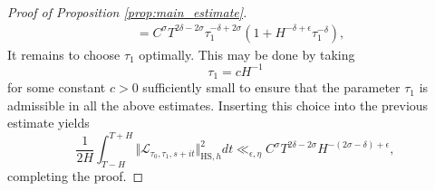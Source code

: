 \documentclass[12pt,letterpaper]{amsart}
\theoremstyle{plain}
\theoremstyle{definition}
\theoremstyle{remark}
\begin{document}
\begin{proof}[Proof of Proposition \ref{prop:main_estimate}]
\begin{align*}
&= C^\sigma T^{2\delta-2 \sigma} \tau_1^{-\delta + 2\sigma} \left( 1 + H^{-\delta+\epsilon}  \tau_1^{-\delta} \right),
\end{align*}
It remains to choose $\tau_1$ optimally. This may be done by taking 
$$
\tau_1 = c H^{-1}
$$
for some constant $c>0$ sufficiently small to ensure that the parameter $\tau_1$ is admissible in all the above estimates. Inserting this choice into the previous estimate yields
$$
\frac{1}{2H} \int_{T-H}^{T+H} \Vert \mathcal{L}_{\tau_0, \tau_1, s+it} \Vert_{\mathrm{HS},h}^2 dt \ll_{\epsilon, \eta} C^\sigma T^{2\delta-2 \sigma} H^{-(2\sigma-\delta)+\epsilon},
$$
completing the proof.
\end{proof}

\normalem
 

\end{document}
